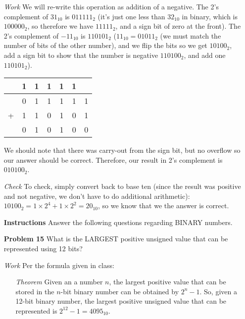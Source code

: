 \documentclass[12pt]{article}
\begin{document}
\begin{enumerate}
  \item[\textit{Work}] We will re-write this operation as addition of a negative. The 2's complement of $31_{10}$ is $011111_2$ (it's just one less than $32_{10}$ in binary, which is $100000_2$, so therefore we have $11111_2$, and a sign bit of zero at the front). The 2's complement of $-11_{10}$ is $110101_2$ ($11_{10}=01011_2$ (we must match the number of bits of the other number), and we flip the bits so we get $10100_2$, add a sign bit to show that the number is negative $110100_2$, and add one $110101_2$).
  \item[]
  \begin{center}
    \begin{tabular}{c@{\,}c@{\,}c@{\,}c@{\,}c@{\,}c@{\,}c}
      & 1 & 1 & 1 & 1 & 1 &   \\    \hline
      & 0 & 1 & 1 & 1 & 1 & 1 \\
    + & 1 & 1 & 0 & 1 & 0 & 1 \\    \hline
      & 0 & 1 & 0 & 1 & 0 & 0
    \end{tabular}
  \end{center}
  \item[] We should note that there was carry-out from the sign bit, but no overflow so our answer should be correct. Therefore, our result in 2's complement is $010100_2$.
  \item[\textit{Check}] To check, simply convert back to base ten (since the result was positive and not negative, we don't have to do additional arithmetic): $10100_2 = 1\times2^4+1\times2^2=20_{10}$, so we know that we the answer is correct.
\end{enumerate}

\begin{enumerate}
  \item[\textbf{Instructions}] Answer the following questions regarding BINARY numbers.
\end{enumerate}

\begin{enumerate}
  \item[\textbf{Problem 15}] What is the LARGEST positive unsigned value that can be represented using 12 bits?
\end{enumerate}

\begin{enumerate}
  \item[\textit{Work}] Per the formula given in class:
  \begin{enumerate}
    \item[\textit{Theorem}] Given an a number $n$, the largest positive value that can be stored in the $n$-bit binary number can be obtained by $2^n-1$. So, given a 12-bit binary number, the largest positive unsigned value that can be represented is $2^{12}-1=4095_{10}$.
  \end{enumerate}
\end{enumerate}
\end{document}
